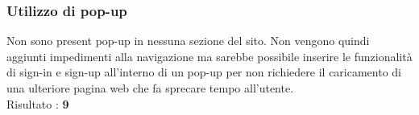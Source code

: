 \subsubsection{Utilizzo di pop-up}
Non sono present pop-up in nessuna sezione del sito. Non vengono quindi aggiunti
impedimenti alla navigazione ma sarebbe possibile inserire le funzionalità di
sign-in e sign-up all'interno di un pop-up per non richiedere il caricamento
di una ulteriore pagina web che fa sprecare tempo all'utente. \\
Risultato : \textbf{9}